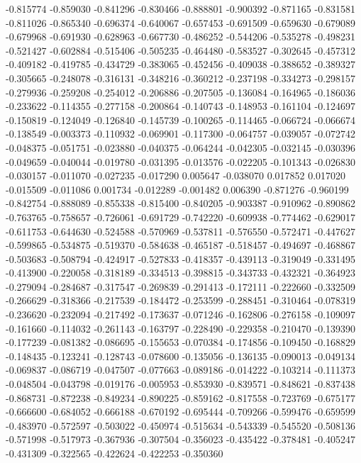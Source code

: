 -0.815774
-0.859030
-0.841296
-0.830466
-0.888801
-0.900392
-0.871165
-0.831581
-0.811026
-0.865340
-0.696374
-0.640067
-0.657453
-0.691509
-0.659630
-0.679089
-0.679968
-0.691930
-0.628963
-0.667730
-0.486252
-0.544206
-0.535278
-0.498231
-0.521427
-0.602884
-0.515406
-0.505235
-0.464480
-0.583527
-0.302645
-0.457312
-0.409182
-0.419785
-0.434729
-0.383065
-0.452456
-0.409038
-0.388652
-0.389327
-0.305665
-0.248078
-0.316131
-0.348216
-0.360212
-0.237198
-0.334273
-0.298157
-0.279936
-0.259208
-0.254012
-0.206886
-0.207505
-0.136084
-0.164965
-0.186036
-0.233622
-0.114355
-0.277158
-0.200864
-0.140743
-0.148953
-0.161104
-0.124697
-0.150819
-0.124049
-0.126840
-0.145739
-0.100265
-0.114465
-0.066724
-0.066674
-0.138549
-0.003373
-0.110932
-0.069901
-0.117300
-0.064757
-0.039057
-0.072742
-0.048375
-0.051751
-0.023880
-0.040375
-0.064244
-0.042305
-0.032145
-0.030396
-0.049659
-0.040044
-0.019780
-0.031395
-0.013576
-0.022205
-0.101343
-0.026830
-0.030157
-0.011070
-0.027235
-0.017290
0.005647
-0.038070
0.017852
0.017020
-0.015509
-0.011086
0.001734
-0.012289
-0.001482
0.006390
-0.871276
-0.960199
-0.842754
-0.888089
-0.855338
-0.815400
-0.840205
-0.903387
-0.910962
-0.890862
-0.763765
-0.758657
-0.726061
-0.691729
-0.742220
-0.609938
-0.774462
-0.629017
-0.611753
-0.644630
-0.524588
-0.570969
-0.537811
-0.576550
-0.572471
-0.447627
-0.599865
-0.534875
-0.519370
-0.584638
-0.465187
-0.518457
-0.494697
-0.468867
-0.503683
-0.508794
-0.424917
-0.527833
-0.418357
-0.439113
-0.319049
-0.331495
-0.413900
-0.220058
-0.318189
-0.334513
-0.398815
-0.343733
-0.432321
-0.364923
-0.279094
-0.284687
-0.317547
-0.269839
-0.291413
-0.172111
-0.222660
-0.332509
-0.266629
-0.318366
-0.217539
-0.184472
-0.253599
-0.288451
-0.310464
-0.078319
-0.236620
-0.232094
-0.217492
-0.173637
-0.071246
-0.162806
-0.276158
-0.109097
-0.161660
-0.114032
-0.261143
-0.163797
-0.228490
-0.229358
-0.210470
-0.139390
-0.177239
-0.081382
-0.086695
-0.155653
-0.070384
-0.174856
-0.109450
-0.168829
-0.148435
-0.123241
-0.128743
-0.078600
-0.135056
-0.136135
-0.090013
-0.049134
-0.069837
-0.086719
-0.047507
-0.077663
-0.089186
-0.014222
-0.103214
-0.111373
-0.048504
-0.043798
-0.019176
-0.005953
-0.853930
-0.839571
-0.848621
-0.837438
-0.868731
-0.872238
-0.849234
-0.890225
-0.859162
-0.817558
-0.723769
-0.675177
-0.666600
-0.684052
-0.666188
-0.670192
-0.695444
-0.709266
-0.599476
-0.659599
-0.483970
-0.572597
-0.503022
-0.450974
-0.515634
-0.543339
-0.545520
-0.508136
-0.571998
-0.517973
-0.367936
-0.307504
-0.356023
-0.435422
-0.378481
-0.405247
-0.431309
-0.322565
-0.422624
-0.422253
-0.350360
